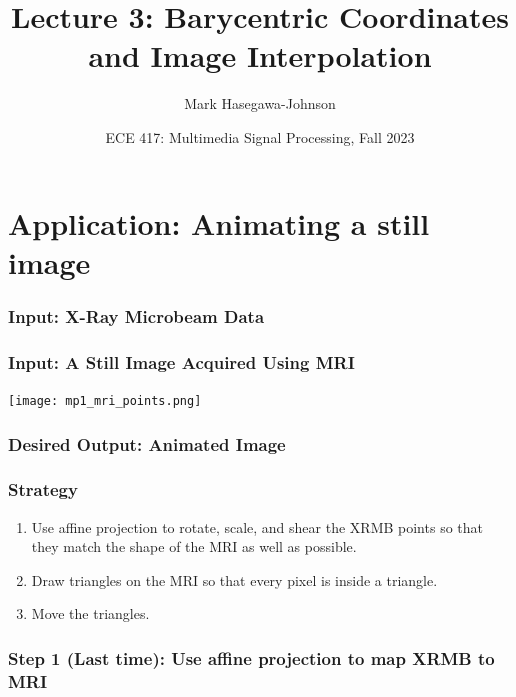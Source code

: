 \documentclass{beamer}
\title{Lecture 3: Barycentric Coordinates and Image Interpolation}
\author{Mark Hasegawa-Johnson}
\date{ECE 417: Multimedia Signal Processing, Fall 2023}
\institute{University of Illinois}
\begin{document}
\begin{frame}
  \maketitle
\end{frame}

\begin{frame}
  \tableofcontents
\end{frame}

\section{Application: Animating a still image}
\setcounter{subsection}{1}

\begin{frame}
  \frametitle{Input: X-Ray Microbeam Data}
  \centerline{}
\end{frame}

\begin{frame}
  \frametitle{Input: A Still Image Acquired Using MRI}
  \centerline{\texttt{[image: mp1\_mri\_points.png]}}
\end{frame}

\begin{frame}
  \frametitle{Desired Output: Animated Image}
  \centerline{}
\end{frame}

\begin{frame}
  \frametitle{Strategy}
  \begin{enumerate}
  \item Use affine projection to rotate, scale, and shear the XRMB
    points so that they match the shape of the MRI as well as possible.
  \item Draw triangles on the MRI so that every pixel is inside a triangle.
  \item Move the triangles.
  \end{enumerate}
\end{frame}

\begin{frame}
  \frametitle{Step 1 (Last time): Use affine projection to map XRMB to MRI}
  \centerline{}
\end{frame}
\end{document}
